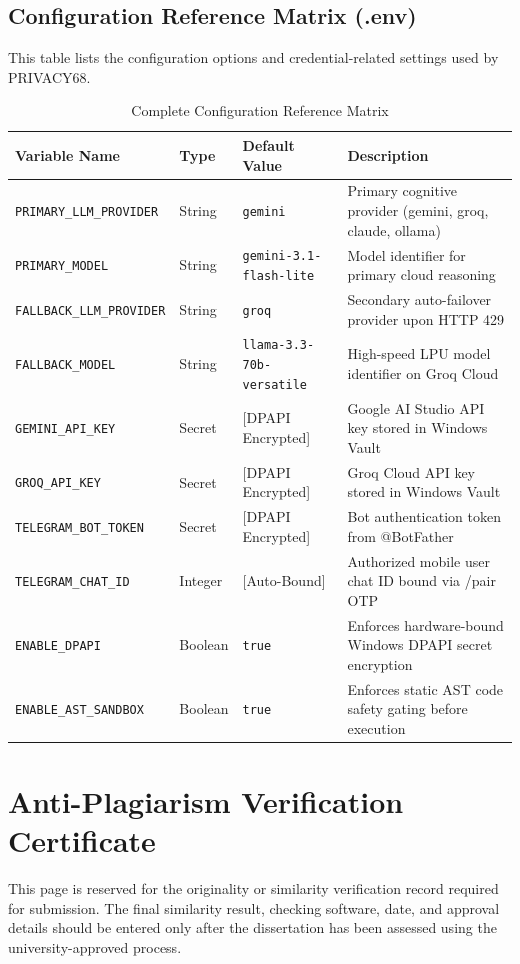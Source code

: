 \documentclass[12pt,letterpaper,oneside]{report}
\begin{document}
\section{Configuration Reference Matrix (.env)}
This table lists the configuration options and credential-related settings used by PRIVACY68.

\begin{table}[H]
\centering
\caption{Complete Configuration Reference Matrix}
\label{tab:config_matrix}
\begin{tabularx}{\textwidth}{|l|l|l|X|}
\hline
\textbf{Variable Name} & \textbf{Type} & \textbf{Default Value} & \textbf{Description}\\ \hline
\texttt{PRIMARY\_LLM\_PROVIDER} & String & \texttt{gemini} & Primary cognitive provider (gemini, groq, claude, ollama)\\ \hline
\texttt{PRIMARY\_MODEL} & String & \texttt{gemini-3.1-flash-lite} & Model identifier for primary cloud reasoning\\ \hline
\texttt{FALLBACK\_LLM\_PROVIDER} & String & \texttt{groq} & Secondary auto-failover provider upon HTTP 429\\ \hline
\texttt{FALLBACK\_MODEL} & String & \texttt{llama-3.3-70b-versatile} & High-speed LPU model identifier on Groq Cloud\\ \hline
\texttt{GEMINI\_API\_KEY} & Secret & [DPAPI Encrypted] & Google AI Studio API key stored in Windows Vault\\ \hline
\texttt{GROQ\_API\_KEY} & Secret & [DPAPI Encrypted] & Groq Cloud API key stored in Windows Vault\\ \hline
\texttt{TELEGRAM\_BOT\_TOKEN} & Secret & [DPAPI Encrypted] & Bot authentication token from @BotFather\\ \hline
\texttt{TELEGRAM\_CHAT\_ID} & Integer & [Auto-Bound] & Authorized mobile user chat ID bound via /pair OTP\\ \hline
\texttt{ENABLE\_DPAPI} & Boolean & \texttt{true} & Enforces hardware-bound Windows DPAPI secret encryption\\ \hline
\texttt{ENABLE\_AST\_SANDBOX} & Boolean & \texttt{true} & Enforces static AST code safety gating before execution\\ \hline
\end{tabularx}
\end{table}

\chapter{Anti-Plagiarism Verification Certificate}
This page is reserved for the originality or similarity verification record required for submission. The final similarity result, checking software, date, and approval details should be entered only after the dissertation has been assessed using the university-approved process.
\end{document}
